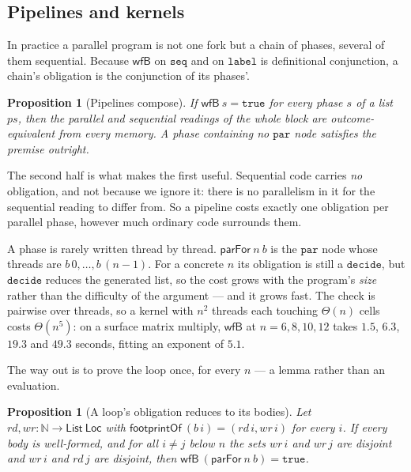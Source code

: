 \documentclass[11pt,a4paper]{article}
\theoremstyle{definition}
\theoremstyle{plain}
\newtheorem{proposition}[definition]{Proposition}
\theoremstyle{remark}
\newcommand{\Loc}{\mathsf{Loc}}
\begin{document}
\subsection{Pipelines and kernels}\label{sec:lang:kernels}

In practice a parallel program is not one fork but a chain of phases, several of them
sequential. Because $\mathsf{wfB}$ on $\texttt{seq}$ and on $\texttt{label}$ is definitional
conjunction, a chain's obligation is the conjunction of its phases'.

\begin{proposition}[Pipelines compose]\label{prop:pipeline}
If $\mathsf{wfB}\ s = \mathtt{true}$ for every phase $s$ of a list $\mathit{ps}$, then the
parallel and sequential readings of the whole block are outcome-equivalent from every
memory. A phase containing no $\texttt{par}$ node satisfies the premise outright.
\end{proposition}

The second half is what makes the first useful. Sequential code carries \emph{no} obligation,
and not because we ignore it: there is no parallelism in it for the sequential reading to
differ from. So a pipeline costs exactly one obligation per parallel phase, however much
ordinary code surrounds them.

A phase is rarely written thread by thread. $\mathsf{parFor}\ n\ b$ is the $\texttt{par}$
node whose threads are $b\,0,\dots,b\,(n{-}1)$. For a concrete $n$ its obligation is still a
$\mathtt{decide}$, but $\mathtt{decide}$ reduces the generated list, so the cost grows with
the program's \emph{size} rather than the difficulty of the argument --- and it grows fast.
The check is pairwise over threads, so a kernel with $n^2$ threads each touching
$\Theta(n)$ cells costs $\Theta(n^5)$: on a surface matrix multiply, $\mathsf{wfB}$ at
$n = 6, 8, 10, 12$ takes $1.5$, $6.3$, $19.3$ and $49.3$ seconds, fitting an exponent
of $5.1$.

The way out is to prove the loop once, for every $n$ --- a lemma rather than an evaluation.

\begin{proposition}[A loop's obligation reduces to its bodies]\label{prop:parfor}
Let $\mathit{rd}, \mathit{wr} : \mathbb{N} \to \mathsf{List}\ \Loc$ with
$\mathsf{footprintOf}\ (b\,i) = (\mathit{rd}\,i, \mathit{wr}\,i)$ for every $i$. If every
body is well-formed, and for all $i \neq j$ below $n$ the sets $\mathit{wr}\,i$ and
$\mathit{wr}\,j$ are disjoint and $\mathit{wr}\,i$ and $\mathit{rd}\,j$ are disjoint, then
$\mathsf{wfB}\ (\mathsf{parFor}\ n\ b) = \mathtt{true}$.
\end{proposition}
\end{document}
